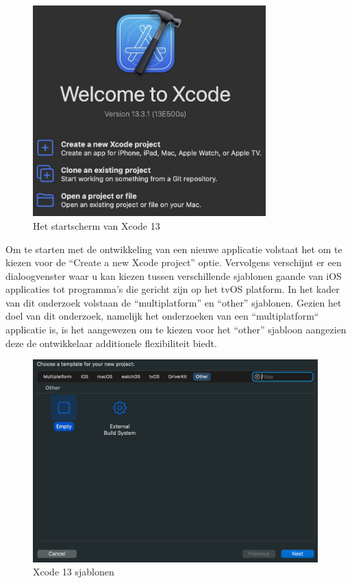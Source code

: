 \begin{figure}[!h]
    \centering
    \includegraphics[width=90mm, scale=0.7]{img/xcodeversie.jpeg}
    \caption{Het startscherm van Xcode 13}
\end{figure}

Om te starten met de ontwikkeling van een nieuwe applicatie volstaat het om te kiezen voor de “Create a new Xcode project” optie. Vervolgens verschijnt er een dialoogvenster waar u kan kiezen tussen verschillende sjablonen gaande van iOS applicaties tot programma’s die gericht zijn op het tvOS platform. In het kader van dit onderzoek volstaan de “multiplatform” en “other” sjablonen. Gezien het doel van dit onderzoek, namelijk het onderzoeken van een “multiplatform“ applicatie is, is het aangewezen om te kiezen voor het “other” sjabloon aangezien deze de ontwikkelaar additionele flexibiliteit biedt.

\begin{figure}[!h]
    \centering
    \includegraphics[width=110mm, scale=0.7]{img/otherproject.png}
    \caption{Xcode 13 sjablonen}
\end{figure}

